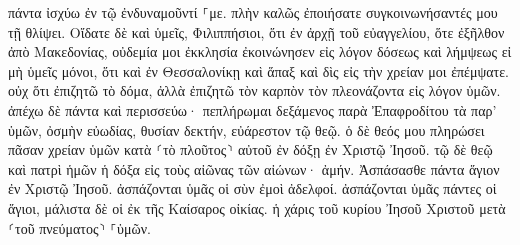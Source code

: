 \documentclass{openreader}
\begin{document}
πάντα ἰσχύω ἐν τῷ ἐνδυναμοῦντί ⸀με. 
πλὴν καλῶς ἐποιήσατε συγκοινωνήσαντές μου τῇ θλίψει. 
Οἴδατε δὲ καὶ ὑμεῖς, Φιλιππήσιοι, ὅτι ἐν ἀρχῇ τοῦ εὐαγγελίου, ὅτε ἐξῆλθον ἀπὸ Μακεδονίας, οὐδεμία μοι ἐκκλησία ἐκοινώνησεν εἰς λόγον δόσεως καὶ λήμψεως εἰ μὴ ὑμεῖς μόνοι, 
ὅτι καὶ ἐν Θεσσαλονίκῃ καὶ ἅπαξ καὶ δὶς εἰς τὴν χρείαν μοι ἐπέμψατε. 
οὐχ ὅτι ἐπιζητῶ τὸ δόμα, ἀλλὰ ἐπιζητῶ τὸν καρπὸν τὸν πλεονάζοντα εἰς λόγον ὑμῶν. 
ἀπέχω δὲ πάντα καὶ περισσεύω· πεπλήρωμαι δεξάμενος παρὰ Ἐπαφροδίτου τὰ παρ’ ὑμῶν, ὀσμὴν εὐωδίας, θυσίαν δεκτήν, εὐάρεστον τῷ θεῷ. 
ὁ δὲ θεός μου πληρώσει πᾶσαν χρείαν ὑμῶν κατὰ ⸂τὸ πλοῦτος⸃ αὐτοῦ ἐν δόξῃ ἐν Χριστῷ Ἰησοῦ. 
τῷ δὲ θεῷ καὶ πατρὶ ἡμῶν ἡ δόξα εἰς τοὺς αἰῶνας τῶν αἰώνων· ἀμήν. 
Ἀσπάσασθε πάντα ἅγιον ἐν Χριστῷ Ἰησοῦ. ἀσπάζονται ὑμᾶς οἱ σὺν ἐμοὶ ἀδελφοί. 
ἀσπάζονται ὑμᾶς πάντες οἱ ἅγιοι, μάλιστα δὲ οἱ ἐκ τῆς Καίσαρος οἰκίας. 
ἡ χάρις τοῦ κυρίου Ἰησοῦ Χριστοῦ μετὰ ⸂τοῦ πνεύματος⸃ ⸀ὑμῶν. 
\end{document}

